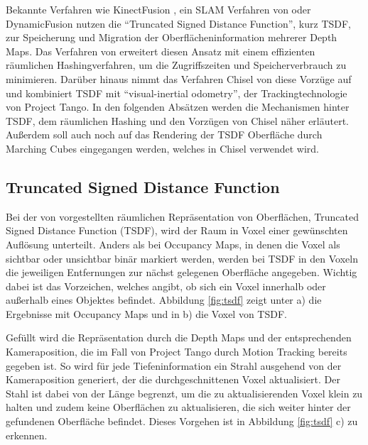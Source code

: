 Bekannte Verfahren wie KinectFusion \citep{newcombe2011kinectfusion}, ein SLAM Verfahren von \citet{bylow2013real} oder DynamicFusion \citep{newcombe2015dynamicfusion} nutzen die \enquote{Truncated Signed Distance Function}, kurz TSDF, zur Speicherung und Migration der Oberflächeninformation mehrerer Depth Maps. Das Verfahren von \citet{niessner2013real} erweitert diesen Ansatz mit einem effizienten räumlichen Hashingverfahren, um die Zugriffszeiten und Speicherverbrauch zu minimieren. Darüber hinaus nimmt das Verfahren Chisel von \citep{Klingensmith_2015_7924} diese Vorzüge auf und kombiniert TSDF mit \enquote{visual-inertial odometry}, der Trackingtechnologie von Project Tango. In den folgenden Absätzen werden die Mechanismen hinter TSDF, dem räumlichen Hashing und den Vorzügen von Chisel näher erläutert. Außerdem soll auch noch auf das Rendering der TSDF Oberfläche durch Marching Cubes eingegangen werden, welches in Chisel verwendet wird. 


\subsection{Truncated Signed Distance Function}

Bei der von \citet{curless1996volumetric} vorgestellten räumlichen Repräsentation von Oberflächen, Truncated Signed Distance Function (TSDF), wird der Raum in Voxel einer gewünschten Auflösung unterteilt. Anders als bei Occupancy Maps, in denen die Voxel als sichtbar oder unsichtbar binär markiert werden, werden bei TSDF in den Voxeln die jeweiligen Entfernungen zur nächst gelegenen Oberfläche angegeben. Wichtig dabei ist das Vorzeichen, welches angibt, ob sich ein Voxel innerhalb oder außerhalb eines Objektes befindet. Abbildung \ref{fig:tsdf} zeigt unter a) die Ergebnisse mit Occupancy Maps und in b) die Voxel von TSDF. \citep{curless1996volumetric} 

Gefüllt wird die Repräsentation durch die Depth Maps und der entsprechenden Kameraposition, die im Fall von Project Tango durch Motion Tracking bereits gegeben ist. So wird für jede Tiefeninformation ein Strahl ausgehend von der Kameraposition generiert, der die durchgeschnittenen Voxel aktualisiert. Der Stahl ist dabei von der Länge begrenzt, um die zu aktualisierenden Voxel klein zu halten und zudem keine Oberflächen zu aktualisieren, die sich weiter hinter der gefundenen Oberfläche befindet. Dieses Vorgehen ist in Abbildung \ref{fig:tsdf} c) zu erkennen. \citep{Compu66:online} 

